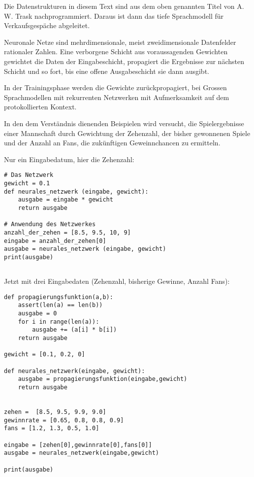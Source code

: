 \documentclass[12pt]{article}
\begin{document}
Die Datenstrukturen in diesem Text sind aus dem oben genannten Titel von A. W. Trask nachprogrammiert. 
Daraus ist dann das tiefe Sprachmodell für Verkaufsgespäche abgeleitet.
    
    


Neuronale Netze sind mehrdimensionale, meist zweidimensionale Datenfelder rationaler Zahlen. 
Eine verborgene Schicht aus voraussagenden Gewichten gewichtet die Daten der Eingabeschicht, propagiert die Ergebnisse zur nächsten Schicht und so fort, 
bis eine offene Ausgabeschicht sie dann ausgibt.

In der Trainingsphase werden die Gewichte zurückpropagiert, bei Grossen Sprachmodellen mit rekurrenten Netzwerken mit Aufmerksamkeit auf dem protokollierten Kontext.

In den dem Verständnis dienenden Beispielen wird versucht, die Spielergebnisse einer Mannschaft durch Gewichtung der Zehenzahl,
der bisher gewonnenen Spiele und der Anzahl an Fans, die zukünftigen Geweinnchancen zu ermitteln.

Nur ein Eingabedatum, hier die Zehenzahl:

\begin{verbatim}
# Das Netzwerk
gewicht = 0.1
def neurales_netzwerk (eingabe, gewicht):
    ausgabe = eingabe * gewicht
    return ausgabe

# Anwendung des Netzwerkes
anzahl_der_zehen = [8.5, 9.5, 10, 9]
eingabe = anzahl_der_zehen[0]
ausgabe = neurales_netzwerk (eingabe, gewicht)
print(ausgabe)


\end{verbatim}

Jetzt mit drei Eingabedaten (Zehenzahl, bisherige Gewinne, Anzahl Fans):

\begin{verbatim}
def propagierungsfunktion(a,b):
    assert(len(a) == len(b))
    ausgabe = 0
    for i in range(len(a)):
        ausgabe += (a[i] * b[i])
    return ausgabe

gewicht = [0.1, 0.2, 0] 
    
def neurales_netzwerk(eingabe, gewicht):
    ausgabe = propagierungsfunktion(eingabe,gewicht)
    return ausgabe


zehen =  [8.5, 9.5, 9.9, 9.0]
gewinnrate = [0.65, 0.8, 0.8, 0.9]
fans = [1.2, 1.3, 0.5, 1.0]

eingabe = [zehen[0],gewinnrate[0],fans[0]]
ausgabe = neurales_netzwerk(eingabe,gewicht)

print(ausgabe)
\end{verbatim}
\end{document}
